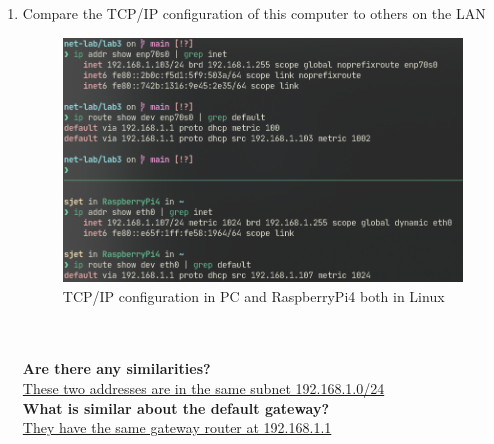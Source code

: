 \documentclass[a4paper]{ctexart}
\begin{document}
\begin{enumerate}
      \newpage
      \item Compare the TCP/IP configuration of this computer to others on the LAN
      \begin{figure}[H]
        \includegraphics*[width=1.0\textwidth]{fig/ip2.png}
        \caption[]{TCP/IP configuration in PC and RaspberryPi4 both in Linux}
      \end{figure}
       \underline{}\\
       \underline{}\\
      \textbf{Are there any similarities?}\\
      \underline{These two addresses are in the same subnet 192.168.1.0/24}\\
      \textbf{What is similar about the default gateway?}\\
      \underline{They have the same gateway router at 192.168.1.1}


\end{enumerate}
\end{document}
